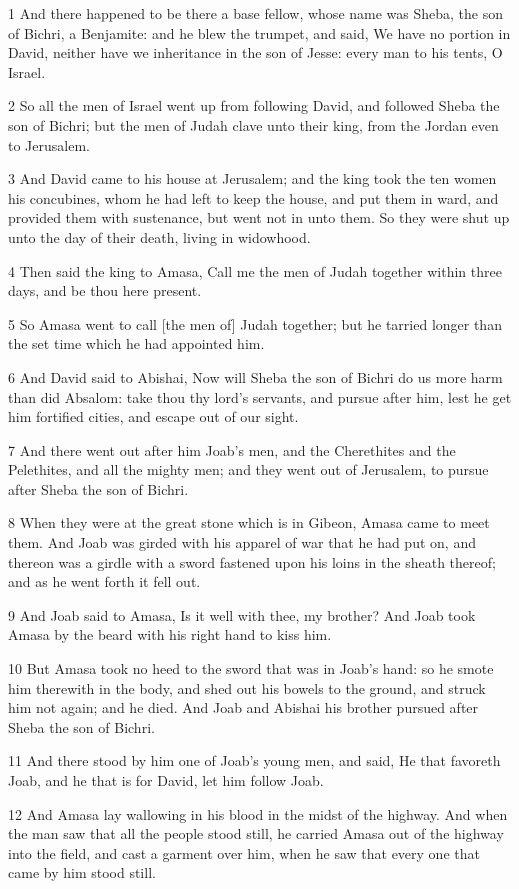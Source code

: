 \par 1 And there happened to be there a base fellow, whose name was Sheba, the son of Bichri, a Benjamite: and he blew the trumpet, and said, We have no portion in David, neither have we inheritance in the son of Jesse: every man to his tents, O Israel.
\par 2 So all the men of Israel went up from following David, and followed Sheba the son of Bichri; but the men of Judah clave unto their king, from the Jordan even to Jerusalem.
\par 3 And David came to his house at Jerusalem; and the king took the ten women his concubines, whom he had left to keep the house, and put them in ward, and provided them with sustenance, but went not in unto them. So they were shut up unto the day of their death, living in widowhood.
\par 4 Then said the king to Amasa, Call me the men of Judah together within three days, and be thou here present.
\par 5 So Amasa went to call [the men of] Judah together; but he tarried longer than the set time which he had appointed him.
\par 6 And David said to Abishai, Now will Sheba the son of Bichri do us more harm than did Absalom: take thou thy lord's servants, and pursue after him, lest he get him fortified cities, and escape out of our sight.
\par 7 And there went out after him Joab's men, and the Cherethites and the Pelethites, and all the mighty men; and they went out of Jerusalem, to pursue after Sheba the son of Bichri.
\par 8 When they were at the great stone which is in Gibeon, Amasa came to meet them. And Joab was girded with his apparel of war that he had put on, and thereon was a girdle with a sword fastened upon his loins in the sheath thereof; and as he went forth it fell out.
\par 9 And Joab said to Amasa, Is it well with thee, my brother? And Joab took Amasa by the beard with his right hand to kiss him.
\par 10 But Amasa took no heed to the sword that was in Joab's hand: so he smote him therewith in the body, and shed out his bowels to the ground, and struck him not again; and he died. And Joab and Abishai his brother pursued after Sheba the son of Bichri.
\par 11 And there stood by him one of Joab's young men, and said, He that favoreth Joab, and he that is for David, let him follow Joab.
\par 12 And Amasa lay wallowing in his blood in the midst of the highway. And when the man saw that all the people stood still, he carried Amasa out of the highway into the field, and cast a garment over him, when he saw that every one that came by him stood still.
